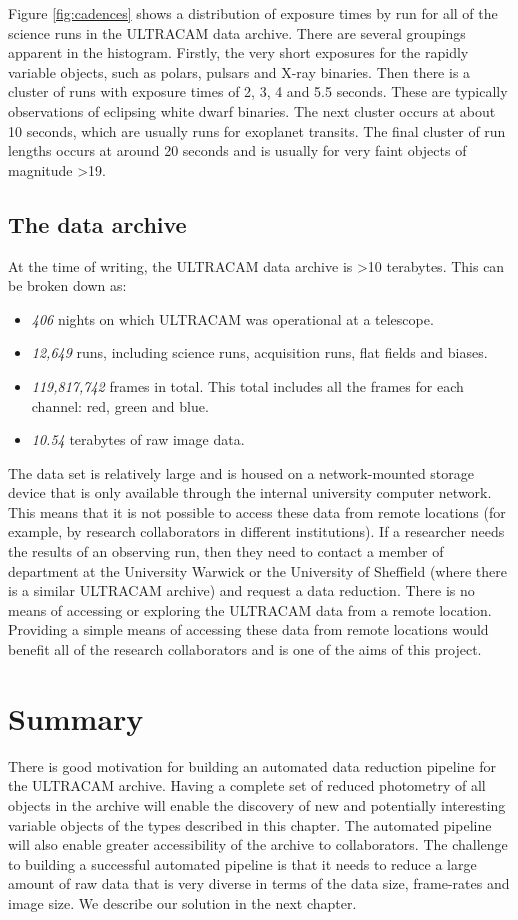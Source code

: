 Figure \ref{fig:cadences} shows a distribution of exposure times by run for all of the science runs in the ULTRACAM data archive. There are several groupings apparent in the histogram. Firstly, the very short exposures for the rapidly variable objects, such as polars, pulsars and X-ray binaries. Then there is a cluster of runs with exposure times of 2, 3, 4 and 5.5 seconds. These are typically observations of eclipsing white dwarf binaries. The next cluster occurs at about 10 seconds, which are usually runs for exoplanet transits. The final cluster of run lengths occurs at around 20 seconds and is usually for very faint objects of magnitude \textgreater 19.

\subsection{The data archive}
At the time of writing, the ULTRACAM data archive is \textgreater 10 terabytes. This can be broken down as:
\begin{itemize}
	\item \emph{406} nights on which ULTRACAM was operational at a telescope.
	\item \emph{12,649} runs, including science runs, acquisition runs, flat fields and biases. 
	\item \emph{119,817,742} frames in total. This total includes all the frames for each channel: red, green and blue.
	\item \emph{10.54} terabytes of raw image data.
\end{itemize} 

The data set is relatively large and is housed on a network-mounted storage device that is only available through the internal university computer network. This means that it is not possible to access these data from remote locations (for example, by research collaborators in different institutions). If a researcher needs the results of an observing run, then they need to contact a member of department at the University Warwick or the University of Sheffield (where there is a similar ULTRACAM archive) and request a data reduction. There is no means of accessing or exploring the ULTRACAM data from a remote location. Providing a simple means of accessing these data from remote locations would benefit all of the research collaborators and is one of the aims of this project.

\section{Summary}
There is good motivation for building an automated data reduction pipeline for the ULTRACAM archive. Having a complete set of reduced photometry of all objects in the archive will enable the discovery of new and potentially interesting variable objects of the types described in this chapter. The automated pipeline will also enable greater accessibility of the archive to collaborators. The challenge to building a successful automated pipeline is that it needs to reduce a large amount of raw data that is very diverse in terms of the data size, frame-rates and image size. We describe our solution in the next chapter. 